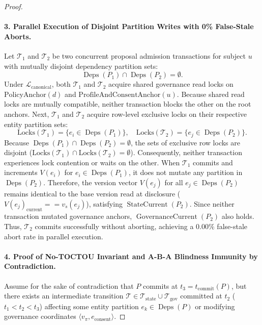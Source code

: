 \documentclass[11pt]{article}
\begin{document}
\begin{proof}
\paragraph{3. Parallel Execution of Disjoint Partition Writes with 0\% False-Stale Aborts.}
Let $\mathcal{T}_1$ and $\mathcal{T}_2$ be two concurrent proposal admission transactions for subject $u$ with mutually disjoint dependency partition sets:
\begin{equation*}
\operatorname{Deps}(P_1) \cap \operatorname{Deps}(P_2) = \emptyset.
\end{equation*}
Under $\mathcal{L}_{\text{canonical}}$, both $\mathcal{T}_1$ and $\mathcal{T}_2$ acquire shared governance read locks on $\text{PolicyAnchor}(d)$ and $\text{ProfileAndConsentAnchor}(u)$. Because shared read locks are mutually compatible, neither transaction blocks the other on the root anchors. Next, $\mathcal{T}_1$ and $\mathcal{T}_2$ acquire row-level exclusive locks on their respective entity partition sets:
\begin{equation*}
\text{Locks}(\mathcal{T}_1) = \{ e_i \in \operatorname{Deps}(P_1) \}, \quad \text{Locks}(\mathcal{T}_2) = \{ e_j \in \operatorname{Deps}(P_2) \}.
\end{equation*}
Because $\operatorname{Deps}(P_1) \cap \operatorname{Deps}(P_2) = \emptyset$, the sets of exclusive row locks are disjoint ($\text{Locks}(\mathcal{T}_1) \cap \text{Locks}(\mathcal{T}_2) = \emptyset$). Consequently, neither transaction experiences lock contention or waits on the other. When $\mathcal{T}_1$ commits and increments $V(e_i)$ for $e_i \in \operatorname{Deps}(P_1)$, it does not mutate any partition in $\operatorname{Deps}(P_2)$. Therefore, the version vector $V(e_j)$ for all $e_j \in \operatorname{Deps}(P_2)$ remains identical to the base version read at disclosure ($V(e_j)_{\text{current}} == v_s(e_j)$), satisfying $\operatorname{StateCurrent}(P_2)$. Since neither transaction mutated governance anchors, $\operatorname{GovernanceCurrent}(P_2)$ also holds. Thus, $\mathcal{T}_2$ commits successfully without aborting, achieving a $0.00\%$ false-stale abort rate in parallel execution.

\paragraph{4. Proof of No-TOCTOU Invariant and A-B-A Blindness Immunity by Contradiction.}
Assume for the sake of contradiction that $P$ commits at $t_3 = t_{\text{commit}}(P)$, but there exists an intermediate transition $\mathcal{T} \in \mathcal{T}_{\text{state}} \cup \mathcal{T}_{\text{gov}}$ committed at $t_2$ ($t_1 < t_2 < t_3$) affecting some entity partition $e_k \in \operatorname{Deps}(P)$ or modifying governance coordinates $\langle v_{\pi}, e_{\text{consent}} \rangle$.


\end{proof}
\end{document}
